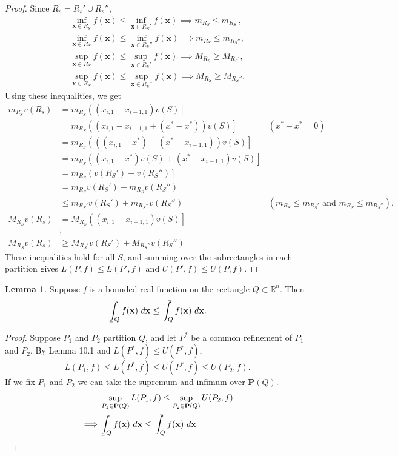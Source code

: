 \documentclass{article}
\def\upint{\mathchoice%
	{\mkern13mu\overline{\vphantom{\intop}\mkern7mu}\mkern-20mu}%
	{\mkern7mu\overline{\vphantom{\intop}\mkern7mu}\mkern-14mu}%
	{\mkern7mu\overline{\vphantom{\intop}\mkern7mu}\mkern-14mu}%
	{\mkern7mu\overline{\vphantom{\intop}\mkern7mu}\mkern-14mu}%
	\int}
\def\lowint{\mkern3mu\underline{\vphantom{\intop}\mkern7mu}\mkern-10mu\int}
\newcommand{\R}{\mathbb{R}}
\newcommand{\x}{\mathbf{x}}
\theoremstyle{definition}
\newtheorem{lemma}{Lemma}[section]
\begin{document}
\begin{proof}
		Since $ R_s = R_s'\cup R_s'' $, 
		\begin{align*}
			\inf_{\x\in R_S}f(\x) \le \inf_{\x\in R_S'}f(\x) \implies m_{R_S} \le m_{R_S'} ,\\
			\inf_{\x\in R_S}f(\x) \le \inf_{\x\in R_S''}f(\x) \implies m_{R_S} \le m_{R_S''},\\
				\sup_{\x\in R_S}f(\x) \le \sup_{\x\in R_S'}f(\x) \implies M_{R_S} \ge M_{R_S'},\\
				\sup_{\x\in R_S}f(\x) \le \sup_{\x\in R_S''}f(\x) \implies M_{R_S} \ge M_{R_S''}.
		\end{align*}
		Using these inequalities, we get 
		\begin{align*}
			m_{R_S}v(R_s)&=m_{R_S}\left((x_{i,1}-x_{i-1,1})v(S)\right]\\ 
			&=m_{R_S}\left((x_{i,1}-x_{i-1,1} + (x^*-x^*) )v(S)\right] & (x^*-x^* = 0)\\
			&=m_{R_S}\left(((x_{i,1}-x^*) + (x^*-x_{i-1,1})) v(S)\right] \\
			& = m_{R_S}\left((x_{i,1}-x^*)v(S) +  (x^*-x_{i-1,1})v(S)\right] \\
			& = m_{R_S}\left(v(R_S') + v(R_S'')\right]\\ 
			& = m_{R_S}v(R_S') + m_{R_S}v(R_S'')\\
			& \le  m_{R_S'}v(R_S') + m_{R_S''}v(R_S'') & (m_{R_S} \le m_{R_S'}\text{ and } m_{R_S} \le m_{R_S''}), \\
			M_{R_S}v(R_s)&=M_{R_S}\left((x_{i,1}-x_{i-1,1})v(S)\right]\\ 
			&\vdots \\
			M_{R_S}v(R_s) & \ge M_{R_S'}v(R_S') + M_{R_S''}v(R_S'')
		\end{align*}
		These inequalities hold for all $ S $, and summing over the subrectangles in each partition gives $ L(P,f)\le L(P',f) $ and $ U(P',f)\le U(P,f) $.
		\end{proof}
	\begin{lemma}
		Suppose $ f $ is a bounded real function on the rectangle $ Q\subset \R^n $. Then $$ \lowint_Q f(\x)\ d\x \le	\upint_Q f(\x)\ d\x .$$ 
	\end{lemma}
	\begin{proof}
		Suppose $ P_1 $ and $ P_2 $ partition $ Q $, and let $ P^* $ be a common refinement of $ P_1 $ and $ P_2 $. By Lemma 10.1 and $ L(P^*,f)\le U(P^*,f) $,
		$$ L(P_1,f)\le L(P^*,f)\le U(P^*,f)\le U(P_2,f).$$
		If we fix $ P_1 $ and $ P_2 $ we can take the supremum and infimum over $ \mathbf P(Q) $. 
		\begin{align*}
			&\sup_{P_1\in \textbf{P}(Q)}L(P_1,f) \le \sup_{P_2\in \textbf{P}(Q)}U(P_2,f)\\\implies &  \lowint_Q f(\x)\ d\x \le	\upint_Q f(\x)\ d\x 
		\end{align*}
	\end{proof}
\end{document}
